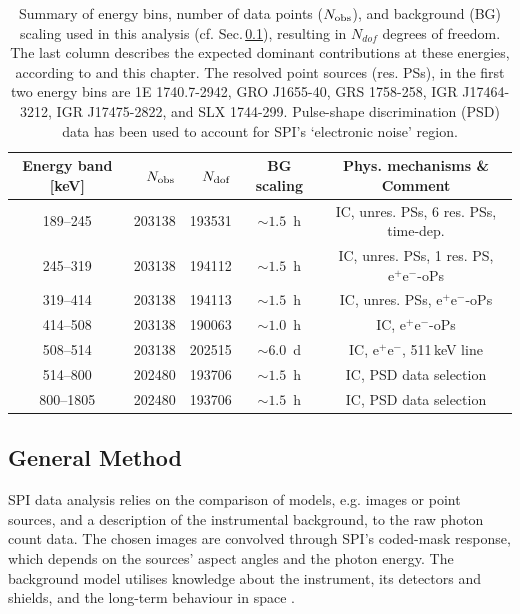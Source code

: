 \documentclass[doublespace,nopageskip]{VTthesis}
\newcommand{\mrm}[1]{\mathrm{#1}}
\begin{document}
\begin{table}[htb]
	\centering
	\caption{Summary of energy bins, number of data points ($N_{\rm obs}$), and background (BG) scaling used in this analysis (cf. Sec.\,\ref{sec:likelihood_analysis}), resulting in $N_{dof}$ degrees of freedom. The last column describes the expected dominant contributions at these energies, according to \citet{2005A&A...444..495S} and this chapter. The resolved point sources (res. PSs), in the first two energy bins are 1E 1740.7-2942, GRO J1655-40, GRS 1758-258, IGR J17464-3212, IGR J17475-2822, and SLX 1744-299. Pulse-shape discrimination (PSD) data has been used to account for SPI's `electronic noise' region.}
	\begin{tabular}{crrcc}
        \toprule
		Energy band [keV] & $N_{\rm obs}$ & $N_{\rm dof}$ & BG scaling & Phys. mechanisms \& Comment \\
		\midrule
		189--245  & 203138 & 193531 & $\sim 1.5$~h & IC, unres. PSs, 6 res. PSs, time-dep. \\
		245--319  & 203138 & 194112 & $\sim 1.5$~h & IC, unres. PSs, 1 res. PS, $\mrm{e^+e^-}$-oPs \\
		319--414  & 203138 & 194113 & $\sim 1.5$~h & IC, unres. PSs, $\mrm{e^+e^-}$-oPs \\
		414--508  & 203138 & 190063 & $\sim 1.0$~h & IC, $\mrm{e^+e^-}$-oPs \\
		508--514  & 203138 & 202515 & $\sim 6.0$~d & IC, $\mrm{e^+e^-}$, 511\,keV line\\
		514--800  & 202480 & 193706 & $\sim 1.5$~h & IC, PSD data selection \\
		800--1805 & 202480 & 193706 & $\sim 1.5$~h & IC, PSD data selection \\
        \bottomrule
	\end{tabular}
	\label{tab:data_set_energies}
\end{table}

\subsection{General Method}\label{sec:likelihood_analysis}
%
SPI data analysis relies on the comparison of models, e.g. images or point sources, and a description of the instrumental background, to the raw photon count data.
%
The chosen images are convolved through SPI's coded-mask response, which depends on the sources' aspect angles and the photon energy.
%
The background model utilises knowledge about the instrument, its detectors and shields, and the long-term behaviour in space \citep{2018A&A...611A..12D,2019A&A...626A..73S}.
\end{document}
